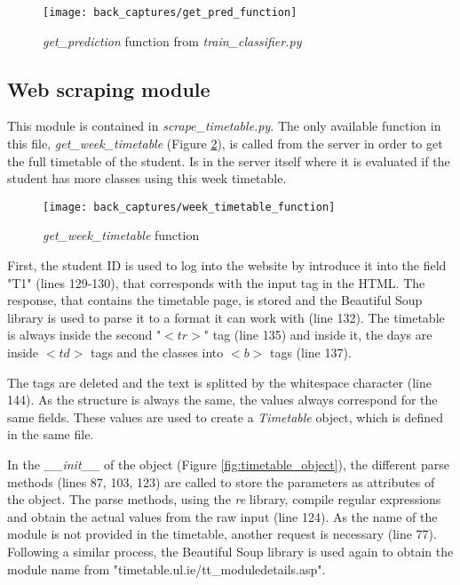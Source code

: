 	\begin{figure}[!ht]
		\centering
		\texttt{[image: back\_captures/get\_pred\_function]}
		\caption{\textit{get{\_}prediction} function from \textit{train{\_}classifier.py}}
		\label{fig:get_pred_function}
	\end{figure}

	\subsection{Web scraping module}
	\label{subsec:scraping_module}
	This module is contained in \textit{scrape{\_}timetable.py}. The only available function in this file, \textit{get{\_}week{\_}timetable} (Figure \ref{fig:get_timetable_function}), is called from the server in order to get the full timetable of the student. Is in the server itself where it is evaluated if the student has more classes using this week timetable.

	\begin{figure}[!ht]
		\centering
		\texttt{[image: back\_captures/week\_timetable\_function]}
		\caption{\textit{get{\_}week{\_}timetable} function}
		\label{fig:get_timetable_function}
	\end{figure}

	First, the student ID is used to log into the website by introduce it into the field "T1" (lines 129-130), that corresponds with the input tag in the HTML. The response, that contains the timetable page, is stored and the Beautiful Soup library is used to parse it to a format it can work with (line 132). The timetable is always inside the second "$<tr>$" tag (line 135) and inside it, the days are inside $<td>$ tags and the classes into $<b>$ tags (line 137). 

	The tags are deleted and the text is splitted by the whitespace character (line 144). As the structure is always the same, the values always correspond for the same fields. These values are used to create a \textit{Timetable} object, which is defined in the same file. 

	In the \textit{{\_}{\_}init{\_}{\_}} of the object (Figure \ref{fig:timetable_object}), the different parse methods (lines 87, 103, 123) are called to store the parameters as attributes of the object. The parse methods, using the \textit{re} library, compile regular expressions and obtain the actual values from the raw input (line 124). As the name of the module is not provided in the timetable, another request is necessary (line 77). Following a similar process, the Beautiful Soup library is used again to obtain the module name from "timetable.ul.ie/tt{\_}moduledetails.asp".

